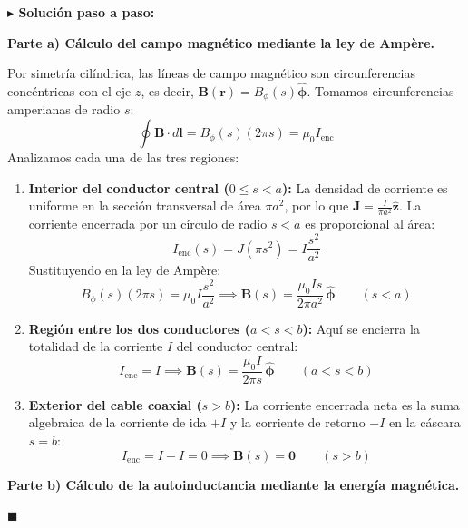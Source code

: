 \documentclass[11pt,a4paper]{book}
\newenvironment{solucion}{%
    \par\medskip\noindent\textbf{\color{blue!65!black}\Large $\blacktriangleright$ Solución paso a paso:}\par\medskip
}{%
    \hfill$\blacksquare$\par\bigskip
}
\newcommand{\phihat}{\hat{\bm{\phi}}}
\newcommand{\zhat}{\hat{\bm{z}}}
\newcommand{\Bvec}{\bm{B}}
\newcommand{\Jvec}{\bm{J}}
\begin{document}
\begin{solucion}
\textbf{Parte a) Cálculo del campo magnético mediante la ley de Ampère.}

Por simetría cilíndrica, las líneas de campo magnético son circunferencias concéntricas con el eje $z$, es decir, $\Bvec(\bm{r}) = B_\phi(s)\phihat$. Tomamos circunferencias amperianas de radio $s$:
\begin{equation}
    \oint \Bvec \cdot d\bm{l} = B_\phi(s) (2\pi s) = \mu_0 I_{\text{enc}}
\end{equation}
Analizamos cada una de las tres regiones:
\begin{enumerate}[label=\roman*)]
    \item \textbf{Interior del conductor central ($0 \le s < a$):}
    La densidad de corriente es uniforme en la sección transversal de área $\pi a^2$, por lo que $\Jvec = \frac{I}{\pi a^2}\zhat$. La corriente encerrada por un círculo de radio $s < a$ es proporcional al área:
    \begin{equation}
        I_{\text{enc}}(s) = J (\pi s^2) = I \frac{s^2}{a^2}
    \end{equation}
    Sustituyendo en la ley de Ampère:
    \begin{equation}
        B_\phi(s) (2\pi s) = \mu_0 I \frac{s^2}{a^2} \implies \Bvec(s) = \frac{\mu_0 I s}{2\pi a^2}\,\phihat \qquad (s < a)
    \end{equation}

    \item \textbf{Región entre los dos conductores ($a < s < b$):}
    Aquí se encierra la totalidad de la corriente $I$ del conductor central:
    \begin{equation}
        I_{\text{enc}} = I \implies \Bvec(s) = \frac{\mu_0 I}{2\pi s}\,\phihat \qquad (a < s < b)
    \end{equation}

    \item \textbf{Exterior del cable coaxial ($s > b$):}
    La corriente encerrada neta es la suma algebraica de la corriente de ida $+I$ y la corriente de retorno $-I$ en la cáscara $s=b$:
    \begin{equation}
        I_{\text{enc}} = I - I = 0 \implies \Bvec(s) = \bm{0} \qquad (s > b)
    \end{equation}
\end{enumerate}

\medskip
\textbf{Parte b) Cálculo de la autoinductancia mediante la energía magnética.}


\end{solucion}
\end{document}
